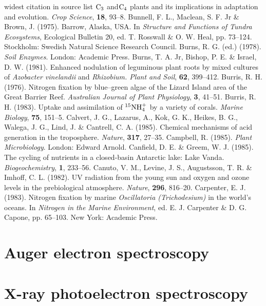 \begin{thereferences}{widest citation in source list}
$ {\rm C}_3$ and$ {\rm  C}_4$ plants and its implications in adaptation
and evolution. {\it Crop Science}, {\bf 18}, 93--8.
Bunnell, F. L., Maclean, S. F. Jr \& Brown, J.
(1975). Barrow, Alaska, USA. In {\it Structure and Functions of
Tundra Ecosystems}, Ecological Bulletin 20, ed.  T. Rosswall
\& O. W. Heal, pp. 73--124. Stockholm: Swedish Natural
Science Research Council.
Burns, R. G. (ed.) (1978). {\it Soil Enzymes}. London:
Academic Press.
Burns, T. A. Jr, Bishop, P. E. \& Israel, D. W.
(1981). Enhanced nodulation of leguminous plant roots by mixed
cultures of {\it Azobacter vinelandii\/} and {\it Rhizobium. Plant
and Soil}, {\bf 62}, 399--412.
Burris, R. H. (1976). Nitrogen fixation by blue--green
algae of the Lizard Island area of the Great Barrier Reef.
{\it Australian Journal of Plant Physiology}, {\bf 3}, 41--51.
Burris, R. H. (1983). Uptake and assimilation of
${}^{15}{\rm NH}^+_4$ by a variety of corals. {\it Marine
Biology}, {\bf 75}, 151--5.
Calvert, J. G., Lazarus, A., Kok, G. K., Heikes,
B. G., Walega, J. G., Lind, J.  \& Cantrell, C. A.
(1985). Chemical mechanisms of acid generation in the troposphere.
{\it Nature}, {\bf 317}, 27--35.
Campbell, R. (1985). {\it Plant Microbiology}. London:
Edward Arnold.
Canfield, D. E. \& Greem, W. J. (1985). The cycling of
nutrients in a closed-basin Antarctic lake: Lake Vanda.
{\it Biogeochemistry}, {\bf 1}, 233--56.
Canuto, V. M., Levine, J. S., Augustsson, T. R.
\& Imhoff, C. L. (1982). UV radiation from the young sun and
oxygen and ozone levels in the prebiological atmosphere. {\it Nature},
{\bf 296}, 816--20.
Carpenter, E. J. (1983). Nitrogen fixation by marine
{\it Oscillatoria (Trichodesium)\/} in the world's oceans. In
{\it Nitrogen in the Marine Environment}, ed. E. J.
Carpenter \& D. G. Capone, pp. 65--103. New York:
Academic Press.
\end{thereferences}

\clearpage
\author[H. E. Bishop]{H. E. BISHOP\\Affiliation}
\chapter{Auger electron spectroscopy}

\clearpage
\author[A. B. Christie]{A. B. CHRISTIE\\Affiliation}
\chapter{X-ray photoelectron spectroscopy}

